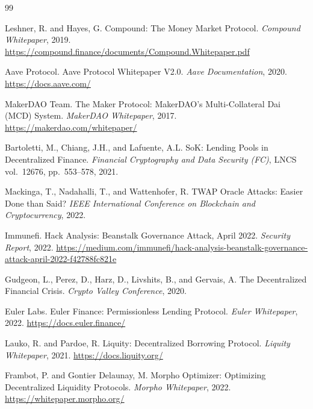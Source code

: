 \documentclass[10pt,a4paper,twocolumn]{article}
\begin{document}
\ifbundle\else
\begin{thebibliography}{99}


Leshner, R. and Hayes, G.
\newblock Compound: The Money Market Protocol.
\newblock \emph{Compound Whitepaper}, 2019.
\newblock \url{https://compound.finance/documents/Compound.Whitepaper.pdf}

Aave Protocol.
\newblock Aave Protocol Whitepaper V2.0.
\newblock \emph{Aave Documentation}, 2020.
\newblock \url{https://docs.aave.com/}

MakerDAO Team.
\newblock The Maker Protocol: MakerDAO's Multi-Collateral Dai (MCD) System.
\newblock \emph{MakerDAO Whitepaper}, 2017.
\newblock \url{https://makerdao.com/whitepaper/}

Bartoletti, M., Chiang, J.H., and Lafuente, A.L.
\newblock SoK: Lending Pools in Decentralized Finance.
\newblock \emph{Financial Cryptography and Data Security (FC)}, LNCS vol.~12676, pp.~553--578, 2021.

Mackinga, T., Nadahalli, T., and Wattenhofer, R.
\newblock TWAP Oracle Attacks: Easier Done than Said?
\newblock \emph{IEEE International Conference on Blockchain and Cryptocurrency}, 2022.

Immunefi.
\newblock Hack Analysis: Beanstalk Governance Attack, April 2022.
\newblock \emph{Security Report}, 2022.
\newblock \url{https://medium.com/immunefi/hack-analysis-beanstalk-governance-attack-april-2022-f42788fc821e}

Gudgeon, L., Perez, D., Harz, D., Livshits, B., and Gervais, A.
\newblock The Decentralized Financial Crisis.
\newblock \emph{Crypto Valley Conference}, 2020.

Euler Labs.
\newblock Euler Finance: Permissionless Lending Protocol.
\newblock \emph{Euler Whitepaper}, 2022.
\newblock \url{https://docs.euler.finance/}

Lauko, R. and Pardoe, R.
\newblock Liquity: Decentralized Borrowing Protocol.
\newblock \emph{Liquity Whitepaper}, 2021.
\newblock \url{https://docs.liquity.org/}

Frambot, P. and Gontier Delaunay, M.
\newblock Morpho Optimizer: Optimizing Decentralized Liquidity Protocols.
\newblock \emph{Morpho Whitepaper}, 2022.
\newblock \url{https://whitepaper.morpho.org/}


\end{thebibliography}
\end{document}
